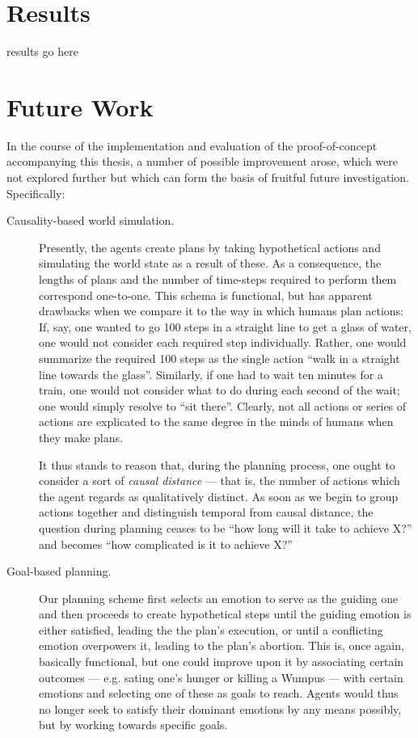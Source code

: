 \section{Results}\label{sec:results}

results go here

\section{Future Work}\label{sec:futureWork}

In the course of the implementation and evaluation of the proof-of-concept accompanying this thesis, a number of possible improvement arose, which were not explored further but which can form the basis of fruitful future investigation. Specifically:

\begin{description}
	\item[Causality-based world simulation.] Presently, the agents create plans by taking hypothetical actions and simulating the world state as a result of these. As a consequence, the lengths of plans and the number of time-steps required to perform them correspond one-to-one.
	This schema is functional, but has apparent drawbacks when we compare it to the way in which humans plan actions: If, say, one wanted to go 100 steps in a straight line to get a glass of water, one would not consider each required step individually. Rather, one would summarize the required 100 steps as the single action ``walk in a straight line towards the glass''. Similarly, if one had to wait ten minutes for a train, one would not consider what to do during each second of the wait; one would simply resolve to ``sit there''. Clearly, not all actions or series of actions are explicated to the same degree in the minds of humans when they make plans.
	
	 It thus stands to reason that, during the planning process, one ought to consider a sort of {\em causal distance} --- that is, the number of actions which the agent regards as qualitatively distinct. As soon as we begin to group actions together and distinguish temporal from causal distance, the question during planning ceases to be ``how long will it take to achieve X?'' and becomes ``how complicated is it to achieve X?''
	 
	 \item[Goal-based planning.] Our planning scheme first selects an emotion to serve as the guiding one and then  proceeds to create hypothetical steps until the guiding emotion is either satisfied, leading the the plan's execution, or until a conflicting emotion overpowers it, leading to the plan's abortion. This is, once again, basically functional, but one could improve upon it by associating certain outcomes --- e.g. sating one's hunger or killing a Wumpus --- with certain emotions and selecting one of these as goals to reach. Agents would thus no longer seek to satisfy their dominant emotions by any means possibly, but by working towards specific goals. 
	 

\end{description}
